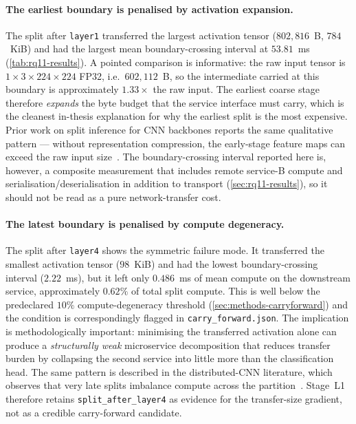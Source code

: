 \paragraph{The earliest boundary is penalised by activation expansion.}
The split after \texttt{layer1} transferred the largest activation
tensor (\(802{,}816\)~B, \(784\)~KiB) and had the largest mean
boundary-crossing interval at \(53.81\)~ms (\cref{tab:rq11-results}).
A pointed comparison is informative: the raw input tensor is
\(1\times3\times224\times224\) FP32, i.e.\ \(602{,}112\)~B, so the
intermediate carried at this boundary is approximately \(1.33\times\)
the raw input. The earliest coarse stage therefore \emph{expands} the
byte budget that the service interface must carry, which is the
cleanest in-thesis explanation for why the earliest split is the most
expensive. Prior work on split inference for CNN backbones reports the
same qualitative pattern --- without representation compression, the
early-stage feature maps can exceed the raw input
size~\cite{bottlenet_pp,deeperthings}. The boundary-crossing interval
reported here is, however, a composite measurement that includes
remote service-B compute and serialisation/deserialisation in addition
to transport (\cref{sec:rq11-results}), so it should not be read as a
pure network-transfer cost.

\paragraph{The latest boundary is penalised by compute degeneracy.}
The split after \texttt{layer4} shows the symmetric failure mode. It
transferred the smallest activation tensor (\(98\)~KiB) and had the
lowest boundary-crossing interval (\(2.22\)~ms), but it left only
\(0.486\)~ms of mean compute on the downstream service, approximately
\(0.62\%\) of total split compute. This is well below the predeclared
\(10\%\) compute-degeneracy threshold (\cref{sec:methods-carryforward})
and the condition is correspondingly flagged in
\texttt{carry\_forward.json}. The implication is methodologically
important: minimising the transferred activation alone can produce a
\emph{structurally weak} microservice decomposition that reduces
transfer burden by collapsing the second service into little more
than the classification head. The same pattern is described in the
distributed-CNN literature, which observes that very late splits
imbalance compute across the partition~\cite{deeperthings,neurosurgeon}.
Stage~L1 therefore retains \texttt{split\_after\_layer4} as evidence for
the transfer-size gradient, not as a credible carry-forward candidate.

